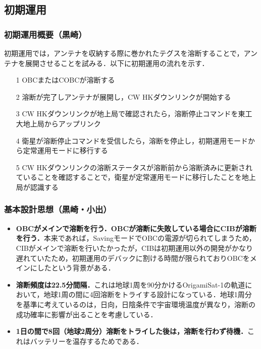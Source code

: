 
\subsection{初期運用}

\subsubsection{初期運用概要（黒崎）}
初期運用では，アンテナを収納する際に巻かれたテグスを溶断することで，アンテナを展開させることを試みる．以下に初期運用の流れを示す．

\begin{itemize}
	\item[1] OBCまたはCOBCが溶断する
	\item[2] 溶断が完了しアンテナが展開し，CW HKダウンリンクが開始する
	\item[3] CW HKダウンリンクが地上局で確認されたら，溶断停止コマンドを東工大地上局からアップリンク
	\item[4] 衛星が溶断停止コマンドを受信したら，溶断を停止し，初期運用モードから定常運用モードに移行する
	\item[5] CW HKダウンリンクの溶断ステータスが溶断前から溶断済みに更新されていることを確認することで，衛星が定常運用モードに移行したことを地上局が認識する
\end{itemize}

\subsubsection{基本設計思想（黒崎・小出）}
\begin{itemize}
	\item \textbf{OBCがメインで溶断を行う．OBCが溶断に失敗している場合にCIBが溶断を行う．}本来であれば，SavingモードでOBCの電源が切られてしまうため，CIBがメインで溶断を行いたかったが，CIBは初期運用以外の開発がかなり遅れていたため，初期運用のデバックに割ける時間が限られておりOBCをメインにしたという背景がある．
	\item \textbf{溶断頻度は22.5分間隔．}これは地球1周を90分かけるOrigamiSat-1の軌道において，地球1周の間に4回溶断をトライする設計になっている．地球1周分を基準に考えているのは，日向，日陰条件で宇宙環境温度が異なり，溶断の成功確率に影響が出ることを考慮している．
	\item \textbf{1日の間で8回（地球2周分）溶断をトライした後は，溶断を行わず待機．}これはバッテリーを温存するためである．
\end{itemize}

